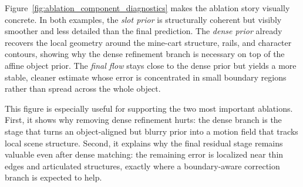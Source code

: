 Figure~\ref{fig:ablation_component_diagnostics} makes the ablation story visually concrete. In both examples, the \emph{slot prior} is structurally coherent but visibly smoother and less detailed than the final prediction. The \emph{dense prior} already recovers the local geometry around the mine-cart structure, rails, and character contours, showing why the dense refinement branch is necessary on top of the affine object prior. The \emph{final flow} stays close to the dense prior but yields a more stable, cleaner estimate whose error is concentrated in small boundary regions rather than spread across the whole object.

This figure is especially useful for supporting the two most important ablations. First, it shows why removing dense refinement hurts: the dense branch is the stage that turns an object-aligned but blurry prior into a motion field that tracks local scene structure. Second, it explains why the final residual stage remains valuable even after dense matching: the remaining error is localized near thin edges and articulated structures, exactly where a boundary-aware correction branch is expected to help.


